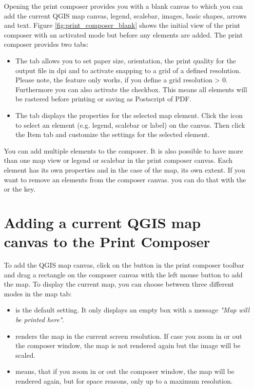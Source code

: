Opening the print composer provides you with a blank canvas to which you can
add the current QGIS map canvas, legend, scalebar, images, basic shapes,
arrows and text. Figure \ref{fig:print_composer_blank} shows the initial view
of the print composer with an activated  mode but
before any elements are added. The print composer provides two tabs:

\begin{itemize}[label=--]
\item The  tab allows you to set paper size, orientation, the
print quality for the output file in dpi and to activate snapping to a grid
of a defined resolution. Please note, the  feature
only works, if you define a grid resolution > 0. Furthermore you can also
activate the  checkbox. This means all elements
will be rastered before printing or saving as Postscript of PDF.
\item The  tab displays the properties for the selected map element.
Click the 
icon to select an element (e.g. legend, scalebar or label) on the canvas.
Then click the Item tab and customize the settings for the selected
element.
\end{itemize}

You can add multiple elements to the composer. It is also possible to have
more than one map view or legend or scalebar in the print composer canvas.
Each element has its own properties and in the case of the map, its own
extent. If you want to remove an elements from the composer canvas. you can 
do that with the  or the  key.

\section{Adding a current QGIS map canvas to the Print Composer}

To add the QGIS map canvas, click on the  button in the print composer toolbar and drag a
rectangle on the composer canvas with the left mouse button to add the map.
To display the current map, you can choose between three different modes in
the map  tab:

\begin{itemize}[label=--]
\item {} is the default setting. It only
displays an empty box with a message \textit{"Map will be printed here"}.
\item {} renders the map in the current screen
resolution. If case you zoom in or out the composer window, the map is not
rendered again but the image will be scaled.
\item {} means, that if you zoom in or out the
composer window, the map will be rendered again, but for space reasons, only
up to a maximum resolution.
\end{itemize}

